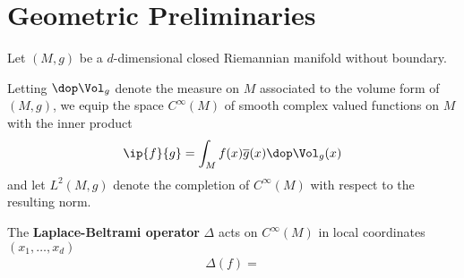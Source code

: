 \section{Geometric Preliminaries}
Let $(M,g)$ be a $d$-dimensional closed Riemannian manifold without boundary. 

Letting $\dop \Vol_g$ denote the measure on $M$ associated to the volume form of $(M,g)$, we equip the space $C^\infty(M)$ of smooth complex valued functions on $M$ with the inner product 
\begin{align*}
    \ip{f}{g} = \int_M f(x) \overline{g}(x) \dop \Vol_g(x) 
\end{align*}
and let $L^2(M,g)$ denote the completion of $C^\infty(M)$ with respect to the resulting norm.

The \textbf{Laplace-Beltrami operator} $\Delta$ acts on $C^\infty(M)$ in local coordinates $(x_1,\dots,x_d)$
\begin{align*}
    \Delta(f) = 
\end{align*} 
